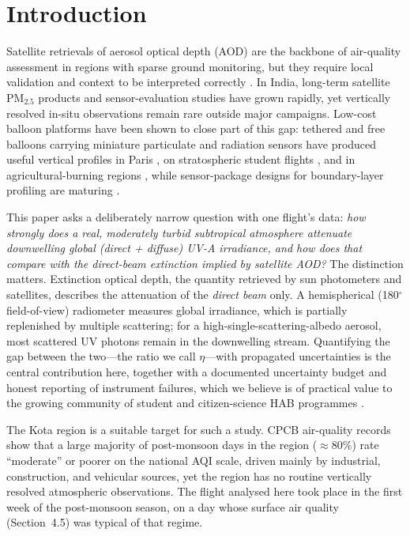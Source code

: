 \documentclass[11pt,a4paper]{article}
\begin{document}
\section{Introduction}

Satellite retrievals of aerosol optical depth (AOD) are the backbone of air-quality
assessment in regions with sparse ground monitoring, but they require local validation and
context to be interpreted correctly \cite{malings2020,lin2020,attey2025}. In India,
long-term satellite PM$_{2.5}$ products \cite{dey2020,maheshwarkar2021} and
sensor-evaluation studies \cite{payra2023} have grown rapidly, yet vertically resolved
in-situ observations remain rare outside major campaigns. Low-cost balloon platforms have
been shown to close part of this gap: tethered and free balloons carrying miniature
particulate and radiation sensors have produced useful vertical profiles in Paris
\cite{renard2020}, on stratospheric student flights \cite{brattich2019}, and in
agricultural-burning regions \cite{potosnak2021}, while sensor-package designs for
boundary-layer profiling are maturing \cite{pang2020}.

This paper asks a deliberately narrow question with one flight's data: \emph{how strongly
does a real, moderately turbid subtropical atmosphere attenuate downwelling global
(direct + diffuse) UV-A irradiance, and how does that compare with the direct-beam
extinction implied by satellite AOD?} The distinction matters. Extinction optical depth,
the quantity retrieved by sun photometers and satellites, describes the attenuation of the
\emph{direct beam} only. A hemispherical (180$^\circ$ field-of-view) radiometer measures
global irradiance, which is partially replenished by multiple scattering; for a
high-single-scattering-albedo aerosol, most scattered UV photons remain in the downwelling
stream. Quantifying the gap between the two---the ratio we call $\eta$---with propagated
uncertainties is the central contribution here, together with a documented uncertainty
budget and honest reporting of instrument failures, which we believe is of practical value
to the growing community of student and citizen-science HAB programmes
\cite{molina2023,giordano2021}.

The Kota region is a suitable target for such a study. CPCB air-quality records
\cite{cpcb} show that a large majority of post-monsoon days in the region ($\approx$80\%)
rate ``moderate'' or poorer on the national AQI scale, driven mainly by industrial,
construction, and vehicular sources, yet the region has no routine vertically resolved
atmospheric observations. The
flight analysed here took place in the first week of the post-monsoon season, on a day
whose surface air quality (Section~4.5) was typical of that regime.
\end{document}
